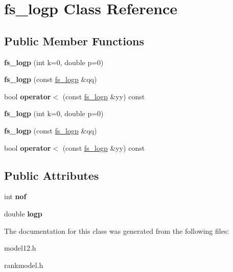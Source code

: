\hypertarget{classfs__logp}{\section{fs\-\_\-logp \-Class \-Reference}
\label{classfs__logp}
}
\subsection*{\-Public \-Member \-Functions}
\begin{DoxyCompactItemize}
\item 
\hypertarget{classfs__logp_af30461e104dbb46163af7cfcea2eec7a}{{\bfseries fs\-\_\-logp} (int k=0, double p=0)}\label{classfs__logp_af30461e104dbb46163af7cfcea2eec7a}

\item 
\hypertarget{classfs__logp_aa67d78ce85b3e49936f04a0da34dc5b6}{{\bfseries fs\-\_\-logp} (const \hyperlink{classfs__logp}{fs\-\_\-logp} \&qq)}\label{classfs__logp_aa67d78ce85b3e49936f04a0da34dc5b6}

\item 
\hypertarget{classfs__logp_a679c2d02c74b1a80859b9399b1d92e8d}{bool {\bfseries operator$<$} (const \hyperlink{classfs__logp}{fs\-\_\-logp} \&yy) const }\label{classfs__logp_a679c2d02c74b1a80859b9399b1d92e8d}

\item 
\hypertarget{classfs__logp_af30461e104dbb46163af7cfcea2eec7a}{{\bfseries fs\-\_\-logp} (int k=0, double p=0)}\label{classfs__logp_af30461e104dbb46163af7cfcea2eec7a}

\item 
\hypertarget{classfs__logp_aa67d78ce85b3e49936f04a0da34dc5b6}{{\bfseries fs\-\_\-logp} (const \hyperlink{classfs__logp}{fs\-\_\-logp} \&qq)}\label{classfs__logp_aa67d78ce85b3e49936f04a0da34dc5b6}

\item 
\hypertarget{classfs__logp_a679c2d02c74b1a80859b9399b1d92e8d}{bool {\bfseries operator$<$} (const \hyperlink{classfs__logp}{fs\-\_\-logp} \&yy) const }\label{classfs__logp_a679c2d02c74b1a80859b9399b1d92e8d}

\end{DoxyCompactItemize}
\subsection*{\-Public \-Attributes}
\begin{DoxyCompactItemize}
\item 
\hypertarget{classfs__logp_a697f38ed8125cc604216aed0e640c04a}{int {\bfseries nof}}\label{classfs__logp_a697f38ed8125cc604216aed0e640c04a}

\item 
\hypertarget{classfs__logp_af7951c02110d5e983eed841ea3674bd1}{double {\bfseries logp}}\label{classfs__logp_af7951c02110d5e983eed841ea3674bd1}

\end{DoxyCompactItemize}


\-The documentation for this class was generated from the following files\-:\begin{DoxyCompactItemize}
\item 
model12.\-h\item 
rankmodel.\-h\end{DoxyCompactItemize}
